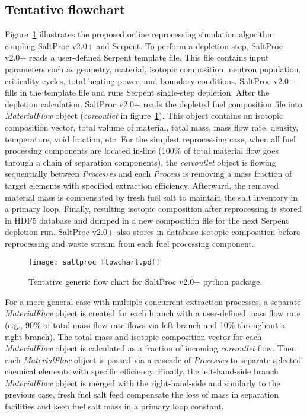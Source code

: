 \subsection{Tentative flowchart}
Figure~\ref{fig:saltproc_flow} illustrates the proposed online reprocessing 
simulation algorithm coupling SaltProc v2.0+ and Serpent. To perform a 
depletion step, SaltProc v2.0+ reads a user-defined Serpent template file. 
This file contains input parameters such as geometry, material, isotopic 
composition, neutron population, criticality cycles, total heating power, and 
boundary conditions. SaltProc v2.0+ fills in the template file and runs 
Serpent single-step depletion. After the depletion calculation, SaltProc v2.0+ 
reads the depleted fuel composition file into \textit{MaterialFlow} object  
(\textit{core\textunderscore outlet} in figure~\ref{fig:saltproc_flow}). This 
object contains an isotopic composition vector, total volume of material, 
total mass, mass flow rate, density, temperature, void fraction, etc. For the 
simplest reprocessing case, when all fuel processing components are located 
in-line (100\% of total material flow goes through a chain of separation 
components), the \textit{core\textunderscore outlet} 
object is flowing sequentially between \textit{Processes} and each 
\textit{Process} is removing a mass fraction of target elements with specified 
extraction efficiency. Afterward, the removed material mass is compensated by 
fresh fuel salt to maintain the salt inventory in a primary loop. 
Finally, resulting isotopic composition after reprocessing is stored in 
HDF5 database and dumped in a new composition file for the next 
Serpent depletion run. SaltProc v2.0+ also stores in database isotopic  
composition before reprocessing and waste stream from each fuel processing 
component. 
\begin{figure}[ht!] %
	\centering
	\texttt{[image: saltproc\_flowchart.pdf]}
	\vspace{-0.15in}
	\caption{Tentative generic flow chart for SaltProc v2.0+ python package.}
	\label{fig:saltproc_flow}
\end{figure}

For a more general case with multiple concurrent extraction processes, a 
separate \textit{MaterialFlow} object is created for each branch with a 
user-defined mass flow rate (e.g., 90\% of total mass flow rate flows via left 
branch and 10\% throughout a right branch). The total mass and isotopic 
composition vector for each \textit{MaterialFlow} object is calculated as a 
fraction of incoming \textit{core\textunderscore outlet} flow. Then each 
\textit{MaterialFlow} object is passed via a cascade of \textit{Processes} to 
separate selected chemical elements with specific efficiency. Finally, the 
left-hand-side branch \textit{MaterialFlow} object is merged with the 
right-hand-side and similarly to the previous case, fresh fuel salt feed 
compensate the loss of mass in separation facilities and keep fuel salt mass 
in a primary loop constant.

